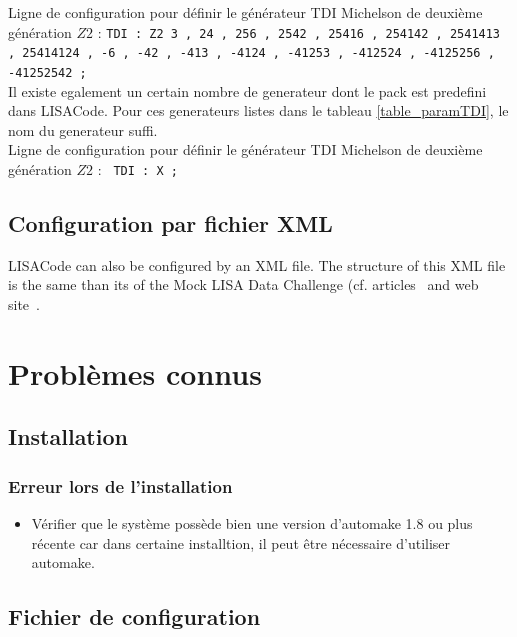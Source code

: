 \documentclass[a4paper,english,12pt]{article}
\begin{document}
Ligne de configuration pour d\'efinir le g\'en\'erateur TDI Michelson de deuxi\`eme g\'en\'eration $Z2$  : 
\hphantom{aaaaa}\texttt{TDI : Z2  3 , 24 , 256 , 2542 , 25416 , 254142 , 2541413 , 25414124 , -6 , -42 , -413 , -4124 , -41253 , -412524 , -4125256 , -41252542 ;} \\

Il existe egalement un certain nombre de generateur dont le pack est predefini dans LISACode. Pour ces generateurs listes dans le tableau \ref{table_paramTDI},  le nom du generateur suffi. \\
 Ligne de configuration pour d\'efinir le g\'en\'erateur TDI Michelson de deuxi\`eme g\'en\'eration $Z2$  : 
\hphantom{aaaaa}\texttt{ TDI : X ; } \\


\newpage

\subsection{Configuration par fichier XML}
\label{SSConfXML}
LISACode can also be configured by an XML file. 
The structure of this XML file is the same than its of the Mock LISA Data Challenge (cf. articles~\cite{MLDCHowTo,MLDC1Res,MLDC2} and web site~\cite{MLDCWeb}.


\newpage

\section{Probl\`emes connus}
\label{SProb}
\subsection{Installation}
\label{SSPbInstall}
\subsubsection{Erreur lors de l'installation}
\label{SSSErrInstall}
\begin{itemize}
\item V\'erifier que le syst\`eme poss\`ede bien une version d'automake 1.8 ou plus r\'ecente car dans certaine installtion, il peut \^etre n\'ecessaire d'utiliser automake.
\end{itemize}

\subsection{Fichier de configuration}
\label{SSPbConfig}
\end{document}
